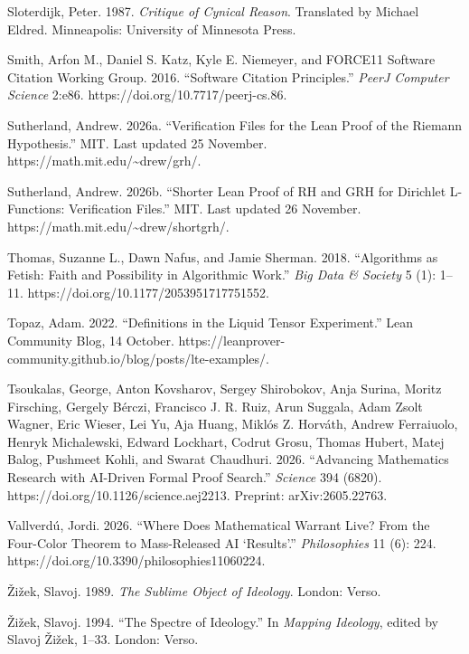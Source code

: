 \documentclass[sn-apa]{sn-jnl}
\begin{document}
\noindent\hangindent=0.5in Sloterdijk, Peter. 1987. \emph{Critique of Cynical Reason}. Translated by Michael Eldred. Minneapolis: University of Minnesota Press.\par\medskip
\noindent\hangindent=0.5in Smith, Arfon M., Daniel S. Katz, Kyle E. Niemeyer, and FORCE11 Software Citation Working Group. 2016. “Software Citation Principles.” \emph{PeerJ Computer Science} 2:e86. https://doi.org/10.7717/peerj-cs.86.\par\medskip
\noindent\hangindent=0.5in Sutherland, Andrew. 2026a. “Verification Files for the Lean Proof of the Riemann Hypothesis.” MIT. Last updated 25 November. https://math.mit.edu/\textasciitilde{}drew/grh/.\par\medskip
\noindent\hangindent=0.5in Sutherland, Andrew. 2026b. “Shorter Lean Proof of RH and GRH for Dirichlet L-Functions: Verification Files.” MIT. Last updated 26 November. https://math.mit.edu/\textasciitilde{}drew/shortgrh/.\par\medskip
\noindent\hangindent=0.5in Thomas, Suzanne L., Dawn Nafus, and Jamie Sherman. 2018. “Algorithms as Fetish: Faith and Possibility in Algorithmic Work.” \emph{Big Data \& Society} 5 (1): 1–11. https://doi.org/10.1177/2053951717751552.\par\medskip
\noindent\hangindent=0.5in Topaz, Adam. 2022. “Definitions in the Liquid Tensor Experiment.” Lean Community Blog, 14 October. https://leanprover-community.github.io/blog/posts/lte-examples/.\par\medskip
\noindent\hangindent=0.5in Tsoukalas, George, Anton Kovsharov, Sergey Shirobokov, Anja Surina, Moritz Firsching, Gergely Bérczi, Francisco J. R. Ruiz, Arun Suggala, Adam Zsolt Wagner, Eric Wieser, Lei Yu, Aja Huang, Miklós Z. Horváth, Andrew Ferraiuolo, Henryk Michalewski, Edward Lockhart, Codrut Grosu, Thomas Hubert, Matej Balog, Pushmeet Kohli, and Swarat Chaudhuri. 2026. “Advancing Mathematics Research with AI-Driven Formal Proof Search.” \emph{Science} 394 (6820). https://doi.org/10.1126/science.aej2213. Preprint: arXiv:2605.22763.\par\medskip
\noindent\hangindent=0.5in Vallverdú, Jordi. 2026. “Where Does Mathematical Warrant Live? From the Four-Color Theorem to Mass-Released AI ‘Results’.” \emph{Philosophies} 11 (6): 224. https://doi.org/10.3390/philosophies11060224.\par\medskip
\noindent\hangindent=0.5in Žižek, Slavoj. 1989. \emph{The Sublime Object of Ideology}. London: Verso.\par\medskip
\noindent\hangindent=0.5in Žižek, Slavoj. 1994. “The Spectre of Ideology.” In \emph{Mapping Ideology}, edited by Slavoj Žižek, 1–33. London: Verso.\par\medskip
\end{document}
